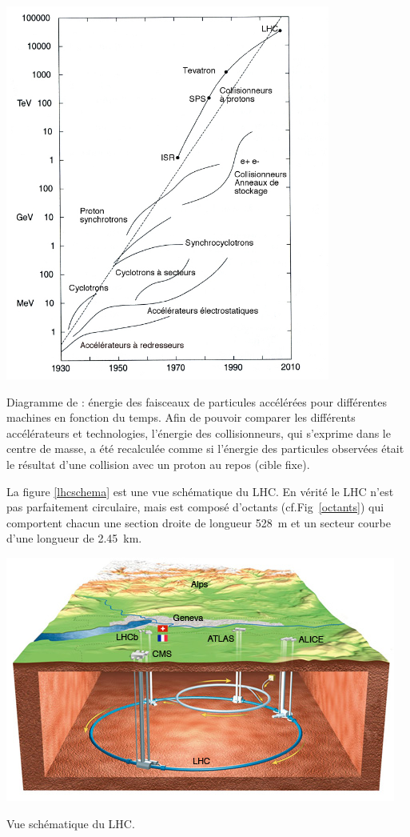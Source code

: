 \begin{minipagewithmarginpars}[ht!]{0.93\textwidth}
	\centering
	\includegraphics[width=0.8\textwidth]{LHC/Livingstone.jpg}
	\captionsetup{type=figure}\caption{Diagramme de  : énergie des faisceaux de particules accélérées pour différentes machines en fonction du temps. Afin de pouvoir comparer les différents accélérateurs et technologies, l'énergie des collisionneurs, qui s'exprime dans le centre de masse, a été recalculée comme si l'énergie des particules observées était le résultat d'une collision avec un proton au repos (cible fixe).}
	\label{livingston}	
\end{minipagewithmarginpars}

La figure \ref{lhcschema} est une vue schématique du LHC. En vérité le LHC n'est pas parfaitement circulaire, mais est composé d'octants (cf.Fig~\ref{octants}) qui comportent chacun une section droite de longueur \SI{528}{\meter} et un secteur courbe d'une longueur de \SI{2.45}{\kilo\meter}. 

\begin{minipagewithmarginpars}[ht!]{\textwidth}
	\centering
	\vspace*{1cm}
	\includegraphics[scale=0.75]{LHC/CERNMap.jpg}
	\captionsetup{type=figure}\caption{Vue schématique du LHC.}
	\label{lhcschema}	
\end{minipagewithmarginpars}

